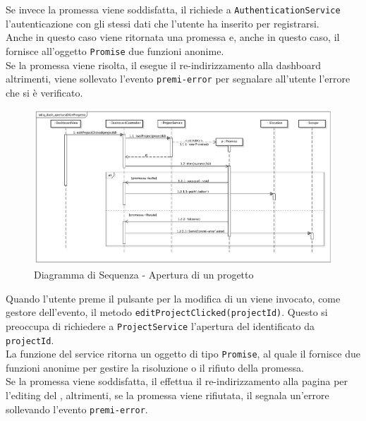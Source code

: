 Se invece la promessa viene soddisfatta, il  richiede a \texttt{AuthenticationService} l'autenticazione con gli stessi dati che l'utente ha inserito per registrarsi.\\
Anche in questo caso viene ritornata una promessa e, anche in questo caso, il  fornisce all'oggetto \texttt{Promise} due funzioni anonime.\\
Se la promessa viene risolta, il  esegue il re-indirizzamento alla dashboard altrimenti, viene sollevato l'evento \texttt{premi-error} per segnalare all'utente l'errore che si è verificato.
\label{dcap}
\begin{center}
\begin{figure}[h]
\centering
\includegraphics[scale=0.25,keepaspectratio]{diagrammi/sequenza/FrontEnd/controllers/q_dash_aperturaDiUnProgetto.pdf}
\caption{Diagramma di Sequenza - Apertura di un progetto}
\end{figure}
\end{center}
\FloatBarrier
Quando l'utente preme il pulsante per la modifica di un  viene invocato, come gestore dell'evento, il metodo \texttt{editProjectClicked(projectId)}. Questo si preoccupa di richiedere a \texttt{ProjectService} l'apertura del  identificato  da \texttt{projectId}.\\
La funzione del service ritorna un oggetto di tipo \texttt{Promise}, al quale il  fornisce due funzioni anonime per gestire la risoluzione o il rifiuto della promessa.\\
Se la promessa viene soddisfatta, il  effettua il re-indirizzamento alla pagina per l'editing del , altrimenti, se la promessa viene rifiutata, il  segnala un'errore sollevando l'evento \texttt{premi-error}.
